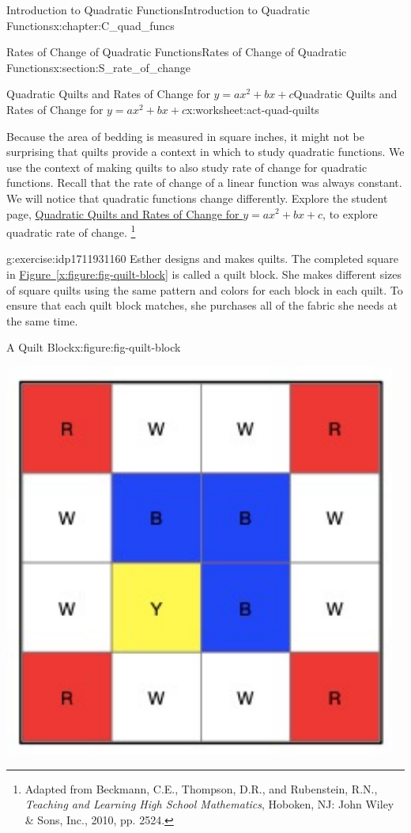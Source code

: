 \documentclass[oneside,10pt,]{book}
\newcommand{\xreffont}{\relax}
\newcommand{\pubtitle}[1]{\textsl{#1}}
\numberwithin{equation}{chapter}
\begin{document}
\begin{chapterptx}{Introduction to Quadratic Functions}{}{Introduction to Quadratic Functions}{}{}{x:chapter:C_quad_funcs}
\begin{sectionptx}{Rates of Change of Quadratic Functions}{}{Rates of Change of Quadratic Functions}{}{}{x:section:S_rate_of_change}
\begin{worksheet-subsection}{Quadratic Quilts and Rates of Change for \(y = ax^2 + bx + c\)}{}{Quadratic Quilts and Rates of Change for \(y = ax^2 + bx + c\)}{}{}{x:worksheet:act-quad-quilts}
\begin{introduction}{}%
Because the area of bedding is measured in square inches, it might not be surprising that quilts provide a context in which to study quadratic functions. We use the context of making quilts to also study rate of change for quadratic functions. Recall that the rate of change of a linear function was always constant. We will notice that quadratic functions change differently. Explore the student page, \hyperref[x:worksheet:act-quad-quilts]{Quadratic Quilts and Rates of Change for \(y = ax^2 + bx + c\)}, to explore quadratic rate of change. \footnote{Adapted from Beckmann, C.E., Thompson, D.R., and Rubenstein, R.N., \pubtitle{Teaching and Learning High School Mathematics}, Hoboken, NJ: John Wiley \& Sons, Inc., 2010, pp. 252\textemdash{}4.\label{g:fn:idp1711932312}}%
\end{introduction}%
\begin{divisionexercise}{1}{}{}{g:exercise:idp1711931160}%
Esther designs and makes quilts. The completed square in \hyperref[x:figure:fig-quilt-block]{Figure~{\xreffont\ref{x:figure:fig-quilt-block}}} is called a quilt block. She makes different sizes of square quilts using the same pattern and colors for each block in each quilt. To ensure that each quilt block matches, she purchases all of the fabric she needs at the same time.%
\begin{figureptx}{A Quilt Block}{x:figure:fig-quilt-block}{}%
\begin{image}{0.35}{0.3}{0.35}%
\includegraphics[width=\linewidth]{external/quilt-block.pdf}

\end{image}
\end{figureptx}
\end{divisionexercise}
\end{worksheet-subsection}
\end{sectionptx}
\end{chapterptx}
\end{document}
